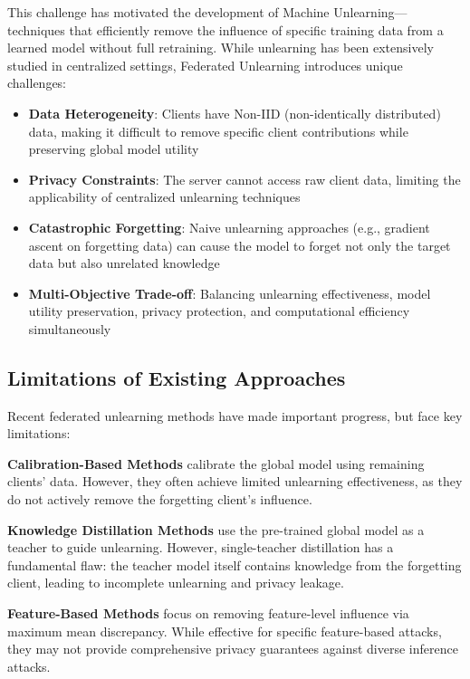 \documentclass[10pt,twocolumn]{article}
\begin{document}
This challenge has motivated the development of Machine Unlearning—techniques that efficiently remove the influence of specific training data from a learned model without full retraining. While unlearning has been extensively studied in centralized settings, Federated Unlearning introduces unique challenges:

\begin{itemize}
\item \textbf{Data Heterogeneity}: Clients have Non-IID (non-identically distributed) data, making it difficult to remove specific client contributions while preserving global model utility
\item \textbf{Privacy Constraints}: The server cannot access raw client data, limiting the applicability of centralized unlearning techniques
\item \textbf{Catastrophic Forgetting}: Naive unlearning approaches (e.g., gradient ascent on forgetting data) can cause the model to forget not only the target data but also unrelated knowledge
\item \textbf{Multi-Objective Trade-off}: Balancing unlearning effectiveness, model utility preservation, privacy protection, and computational efficiency simultaneously
\end{itemize}

\subsection{Limitations of Existing Approaches}

Recent federated unlearning methods have made important progress, but face key limitations:

\textbf{Calibration-Based Methods} calibrate the global model using remaining clients' data. However, they often achieve limited unlearning effectiveness, as they do not actively remove the forgetting client's influence.

\textbf{Knowledge Distillation Methods} use the pre-trained global model as a teacher to guide unlearning. However, single-teacher distillation has a fundamental flaw: the teacher model itself contains knowledge from the forgetting client, leading to incomplete unlearning and privacy leakage.

\textbf{Feature-Based Methods} focus on removing feature-level influence via maximum mean discrepancy. While effective for specific feature-based attacks, they may not provide comprehensive privacy guarantees against diverse inference attacks.
\end{document}
